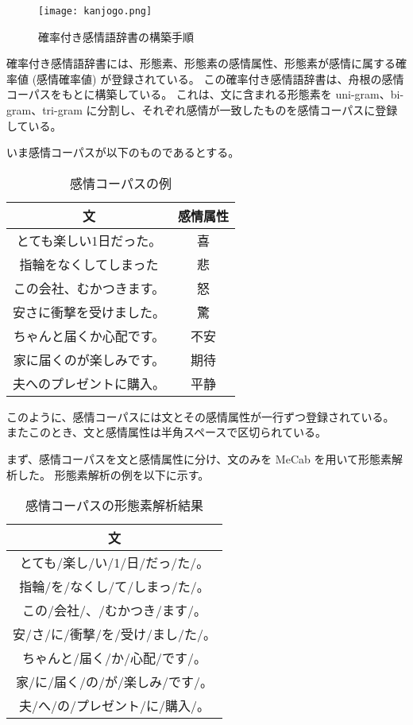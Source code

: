 \documentclass[11pt,a4j]{jsarticle}
\begin{document}
\begin{figure}[h]
  \texttt{[image: kanjogo.png]}
  \caption{確率付き感情語辞書の構築手順}
  \label{fig:kanjogo}
\end{figure}

確率付き感情語辞書には、形態素、形態素の感情属性、形態素が感情に属する確率値 (感情確率値) が登録されている。
この確率付き感情語辞書は、舟根の感情コーパスをもとに構築している。
これは、文に含まれる形態素を uni-gram、bi-gram、tri-gram に分割し、それぞれ感情が一致したものを感情コーパスに登録している。

いま感情コーパスが以下のものであるとする。

\begin{table}[htb]
  \caption{感情コーパスの例}
  \centering
  \begin{tabular}{c|c} \hline
    文 & 感情属性 \\ \hline \hline
    とても楽しい1日だった。 & 喜 \\
    指輪をなくしてしまった & 悲 \\
    この会社、むかつきます。 & 怒 \\ 
    安さに衝撃を受けました。 & 驚 \\
    ちゃんと届くか心配です。 & 不安 \\
    家に届くのが楽しみです。 & 期待 \\
    夫へのプレゼントに購入。& 平静 \\ \hline
  \end{tabular}
\end{table}

このように、感情コーパスには文とその感情属性が一行ずつ登録されている。
またこのとき、文と感情属性は半角スペースで区切られている。

まず、感情コーパスを文と感情属性に分け、文のみを MeCab を用いて形態素解析した。
形態素解析の例を以下に示す。

\begin{table}[htb]
  \caption{感情コーパスの形態素解析結果}
  \centering
  \begin{tabular}{c} \hline
    文\\ \hline \hline
    とても/楽し/い/1/日/だっ/た/。\\
    指輪/を/なくし/て/しまっ/た/。\\
    この/会社/、/むかつき/ます/。 \\ 
    安/さ/に/衝撃/を/受け/まし/た/。\\
    ちゃんと/届く/か/心配/です/。\\
    家/に/届く/の/が/楽しみ/です/。\\
    夫/へ/の/プレゼント/に/購入/。\\ \hline
  \end{tabular}
\end{table}
\end{document}
